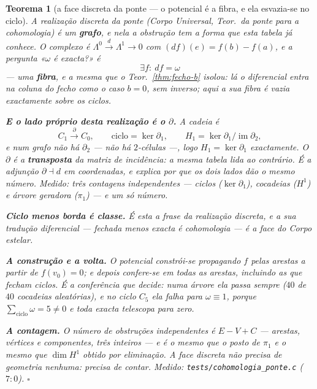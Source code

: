 \documentclass[11pt,a4paper]{article}
\newtheorem{teorema}{Teorema}
\newcommand{\code}[1]{\texttt{#1}}
\begin{document}
\begin{teorema}[a face discreta da ponte --- o potencial é a fibra, e ela
esvazia-se no ciclo]\label{thm:ponte-discreta}
A realização discreta da ponte
(\emph{Corpo Universal}, Teor.~da ponte para a cohomologia) é um
\textbf{grafo}, e nela a obstrução tem a forma que esta tabela já
conhece. O complexo é
$\Lambda^{0}\xrightarrow{d}\Lambda^{1}\to0$ com
$(df)(e)=f(b)-f(a)$, e a pergunta «$\omega$ é exacta?» é
\[
\boxed{\;\exists f:\ df=\omega\;}
\]
--- uma \textbf{fibra}, e a mesma que o Teor.~\ref{thm:fecho-b} isolou:
lá o diferencial entra na coluna do fecho como o caso $b=0$, sem
inverso; aqui a sua fibra é vazia exactamente sobre os ciclos.

\textbf{E o lado próprio desta realização é o $\partial$.} A cadeia é
\[
C_{1}\xrightarrow{\;\partial\;}C_{0},
\qquad
\text{ciclo}=\ker\partial_{1},
\qquad
H_{1}=\ker\partial_{1}/\operatorname{im}\partial_{2},
\]
e num grafo \emph{não há} $\partial_{2}$ --- não há $2$-células ---,
logo $H_{1}=\ker\partial_{1}$ exactamente. O $\partial$ é a
\textbf{transposta} da matriz de incidência: a mesma tabela lida ao
contrário. É a adjunção $\partial\dashv d$ em coordenadas, e explica
por que os dois lados dão o mesmo número. Medido: três contagens
independentes --- ciclos ($\ker\partial_1$), cocadeias ($H^1$) e árvore
geradora ($\pi_1$) --- e um só número.

\textbf{Ciclo menos borda é classe.} É esta a frase da realização
discreta, e a sua tradução diferencial --- \emph{fechada menos exacta é
cohomologia} --- é a face do \emph{Corpo estelar}.

\textbf{A construção e a volta.} O potencial constrói-se propagando
$f$ pelas arestas a partir de $f(v_{0})=0$; e depois \emph{confere-se
em todas as arestas}, incluindo as que fecham ciclos. É a conferência
que decide: numa árvore ela passa sempre ($40$ de $40$ cocadeias
aleatórias), e no ciclo $C_{5}$ ela falha para $\omega\equiv1$, porque
$\sum_{\text{ciclo}}\omega=5\neq0$ e toda exacta telescopa para zero.

\textbf{A contagem.} O número de obstruções independentes é
$E-V+C$ --- arestas, vértices e componentes, três inteiros --- e é
\emph{o mesmo} que o posto de $\pi_{1}$ e o mesmo que $\dim H^{1}$
obtido por eliminação. \emph{A face discreta não precisa de geometria
nenhuma: precisa de contar.}
\emph{Medido:} \code{tests/cohomologia\_ponte.c} ($7{:}0$).
$\square$
\end{teorema}
\end{document}
